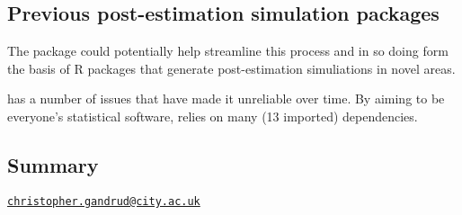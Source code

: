 \subsection{Previous post-estimation simulation
packages}\label{previous-post-estimation-simulation-packages}

The  package could potentially help streamline this
process and in so doing form the basis of R packages that generate
post-estimation simuliations in novel areas.

 has a number of issues that have made it unreliable over
time. By aiming to be everyone's statistical software, 
relies on many (13 imported) dependencies.

\subsection{Summary}\label{summary}



\address{%
Christopher Gandrud\\
City University London and Hertie School of Governance\\
Rhind Building\\ London, EC1V 0HB\\
}
\href{mailto:christopher.gandrud@city.ac.uk}{\nolinkurl{christopher.gandrud@city.ac.uk}}

